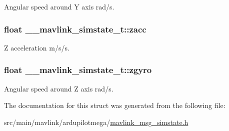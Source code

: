 Angular speed around Y axis rad/s. 

\hypertarget{struct____mavlink__simstate__t_a2aabeeda13a4f099a2841d65f0d13d86}{
\subsubsection[{zacc}]{\setlength{\rightskip}{0pt plus 5cm}float \+\_\+\+\_\+mavlink\+\_\+simstate\+\_\+t\+::zacc}}\label{struct____mavlink__simstate__t_a2aabeeda13a4f099a2841d65f0d13d86}


Z acceleration m/s/s. 

\hypertarget{struct____mavlink__simstate__t_aded04170674bab4dab87ad878d0131d4}{
\subsubsection[{zgyro}]{\setlength{\rightskip}{0pt plus 5cm}float \+\_\+\+\_\+mavlink\+\_\+simstate\+\_\+t\+::zgyro}}\label{struct____mavlink__simstate__t_aded04170674bab4dab87ad878d0131d4}


Angular speed around Z axis rad/s. 



The documentation for this struct was generated from the following file\+:\begin{DoxyCompactItemize}
\item 
src/main/mavlink/ardupilotmega/\hyperlink{mavlink__msg__simstate_8h}{mavlink\+\_\+msg\+\_\+simstate.\+h}\end{DoxyCompactItemize}
